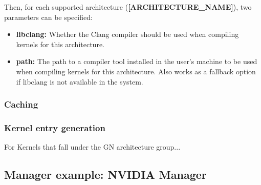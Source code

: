 Then, for each supported architecture (\textbf{[ARCHITECTURE\_NAME]}), two parameters can be specified:
\begin{itemize}
    \item \textbf{libclang:} Whether the Clang compiler should be used when compiling kernels for this architecture.
    \item \textbf{path:} The path to a compiler tool installed in the user's machine to be used when compiling kernels for this architecture. Also works as a fallback option if libclang is not available in the system.
\end{itemize}

\subsubsection{Caching} \label{HHAL:BinaryCaching}


\subsubsection{Kernel entry generation}

For Kernels that fall under the GN architecture group...




\subsection{Manager example: NVIDIA Manager}






